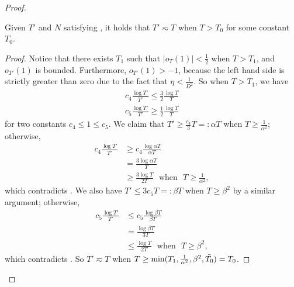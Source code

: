 \begin{proof}
\begin{lemma}\label{lem:k-small-loss-bound-T'}
    Given $T'$ and $N$ satisfying , it holds that $T'\eqsim T$ when $T>T_0$ for some constant $T_0$.
\end{lemma}
\begin{proof}
Notice that there exists $T_1$ such that $|o_T(1)|<\frac{1}{2}$ when $T>T_1$, and $o_{T'}(1)$ is bounded. Furthermore, $o_{T'}(1)>-1$, because the left hand side is strictly greater than zero due to the fact that $\eta < \frac{1}{D^2}$. So when $T>T_1$, we have
\begin{align}
    c_4\frac{\log T'}{T'} \leq \frac{3}{2}\frac{\log T}{T} \label{equ:T'-less-than}\\
    c_5\frac{\log T'}{T'} \geq \frac{1}{2}\frac{\log T}{T} \label{equ:T'-bigger-than}
\end{align}
for two constants $c_4\leq 1\leq c_5$.
We claim that $T'\geq \frac{c_4}{3}T =:\alpha T$ when $T\geq \frac{1}{\alpha^2}$; otherwise,
\begin{align*}
    c_4\frac{\log T'}{T'}&\geq c_4\frac{\log \alpha T}{\alpha T} \\
    &=\frac{3\log \alpha T}{T} \\
    &\geq\frac{3\log T}{2T} ~~~\text{when} ~~~T\geq \frac{1}{\alpha^2},
\end{align*}
which contradicts . We also have $T'\leq 3c_5T =:\beta T$ when $T\geq \beta^2$ by a similar argument; otherwise, 
\begin{align*}
    c_5\frac{\log T'}{T'}&\leq c_5\frac{\log \beta T}{\beta T} \\
    &=\frac{\log \beta T}{3T} \\
    &\leq\frac{\log T}{2T} ~~~\text{when} ~~~T\geq \beta^2,
\end{align*}
which contradicts . So $T' \eqsim T$ when $T\geq\min(T_1, \frac{1}{\alpha^2}, \beta^2, \Tilde{T_0})=T_0$.


\end{proof}
\end{proof}
